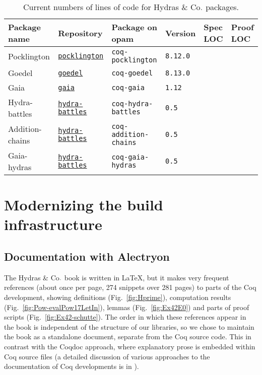 \documentclass{easychair}
\newcommand{\coq}{Coq\xspace}
\newcommand{\alectr}{Alectryon\xspace}
\newcommand{\Hydras}{Hydras \& Co$\text.$\xspace}
\begin{document}
\begin{table}[ht]
\centering
\footnotesize
\begin{tabular}{|l|l|l|l|l|l|}
\hline
\textbf{Package name} & \textbf{Repository} & \textbf{Package on opam} & \textbf{Version} & \textbf{Spec LOC} & \textbf{Proof LOC}\\
\hline
Pocklington & \href{https://github.com/coq-community/pocklington}{\texttt{pocklington}} & \texttt{coq-pocklington} & \texttt{8.12.0} & & \\
\hline
Goedel & \href{https://github.com/coq-community/goedel}{\texttt{goedel}} & \texttt{coq-goedel} & \texttt{8.13.0} & & \\
\hline
Gaia & \href{https://github.com/coq-community/gaia}{\texttt{gaia}} & \texttt{coq-gaia} & \texttt{1.12} & & \\
\hline
Hydra-battles & \href{https://github.com/coq-community/hydra-battles}{\texttt{hydra-battles}} & \texttt{coq-hydra-battles} & \texttt{0.5} & & \\
\hline
Addition-chains & \href{https://github.com/coq-community/hydra-battles}{\texttt{hydra-battles}} & \texttt{coq-addition-chains} & \texttt{0.5} & & \\
\hline
Gaia-hydras & \href{https://github.com/coq-community/hydra-battles}{\texttt{hydra-battles}} & \texttt{coq-gaia-hydras} & \texttt{0.5} & & \\
\hline
\end{tabular}
\caption{Current numbers of lines of code for \Hydras packages.}
\label{tbl:loc}
\end{table}


\section{Modernizing the build infrastructure}

\subsection{Documentation with \alectr}

The \Hydras book is written in LaTeX, but it makes very frequent references (about once per page, 274 snippets over 281 pages) to parts of the \coq development, showing definitions (Fig.~\ref{fig:Hprime}), computation results (Fig.~\ref{fig:Pow-evalPow17LetIn}), lemmas (Fig.~\ref{fig:Ex42E0}) and parts of  proof scripts (Fig.~\ref{fig:Ex42-schutte}). The order in which these references appear in the book is independent of the structure of our libraries, so we chose to maintain the book as a standalone document, separate from the \coq source code.  This in contrast with the Coqdoc approach, where explanatory prose is embedded within \coq source files (a detailed discussion of various approaches to the documentation of \coq developments is in \cite{alectryonpaper}).
\end{document}
